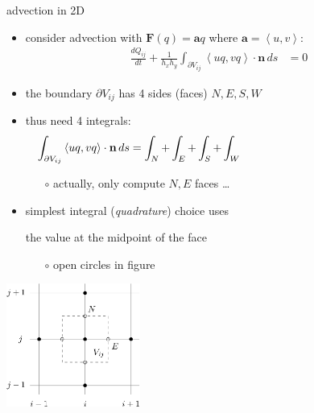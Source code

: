 \documentclass[10pt,hyperref,dvipsnames]{beamer}
\newcommand{\ba}{\mathbf{a}}
\newcommand{\bn}{\mathbf{n}}
\newcommand{\bF}{\mathbf{F}}
\begin{document}
\begin{frame}{advection in 2D}

\begin{itemize}
\item consider advection with $\bF(q) = \ba q$ where $\ba = \left<u,v\right>$:
\begin{align*}
\frac{dQ_{ij}}{dt} + \frac{1}{h_x h_y} \int_{\partial V_{ij}} \left<uq,vq\right> \cdot \bn \,ds &= 0
\end{align*}
\item the boundary $\partial V_{ij}$ has 4 sides (faces) $N,E,S,W$
\item thus need 4 integrals:
    $$\int_{\partial V_{ij}} \left<uq,vq\right> \cdot \bn \,ds = \int_N + \int_E + \int_S + \int_W \hspace{50mm}$$

    \begin{itemize}
    \item[$\circ$] actually, only compute $N,E$ faces \dots
    \end{itemize}

\item simplest integral (\emph{quadrature}) choice uses

the value at the midpoint of the face

    \begin{itemize}
    \item[$\circ$] open circles in figure
    \end{itemize}
\end{itemize}

\vspace{-35mm}
\hfill \includegraphics[width=0.33\textwidth]{figs/bueler11p8facemidpoints}
\end{frame}
\end{document}
